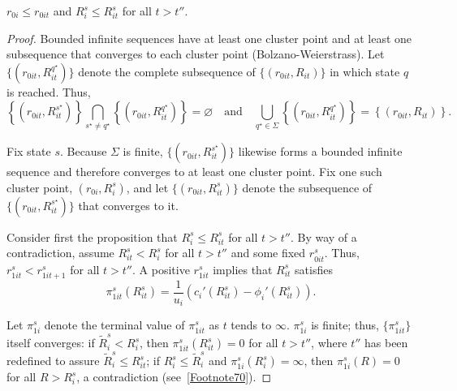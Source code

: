 \begin{lemma}\label{Lemma2}
	$r_{0i}\le r_{0it}$ and $R_i^s\le R_{it}^s$ for all $t>t''$.
\end{lemma}
\begin{proof}
Bounded infinite sequences have at least one cluster point and at least one subsequence that converges to each cluster point (Bolzano-Weierstrass). Let $\{(r_{0it},R_{it}^{q^\star})\}$ denote the complete subsequence of $\{(r_{0it},R_{it})\}$ in which state $q$ is reached. Thus,
\begin{equation*}
	\left\{\left(r_{0it},R_{it}^{s^\star}\right)\right\}\bigcap\limits_{s^\star\ne q^\star}\left\{\left(r_{0it},R_{it}^{q^\star}\right)\right\}=\varnothing\quad\text{and}\quad\bigcup\limits_{q^\star\in\Sigma}\left\{\left(r_{0it},R_{it}^{q^\star}\right)\right\}=\left\{\left(r_{0it},R_{it}\right)\right\}.
\end{equation*}

Fix state $s$. Because $\Sigma$ is finite, $\{(r_{0it},R_{it}^{s^\star})\}$ likewise forms a bounded infinite sequence and therefore converges to at least one cluster point. Fix one such cluster point, $(r_{0i}, R_i^s)$, and let $\{(r_{0it},R_{it}^s)\}$ denote the subsequence of $\{(r_{0it},R_{it}^{s^\star})\}$ that converges to it.

Consider first the proposition that $R_i^s\le R_{it}^s$ for all $t>t''$. By way of a contradiction, assume $R_{it}^s<R_i^s$ for all $t>t''$ and some fixed $r_{0it}^s$. Thus, $r_{1it}^s<r_{1it+1}^s$ for all $t>t''$. A positive $r_{1it}^s$ implies that $R_{it}^s$ satisfies
\begin{equation}\label{equationA7}
	\pi_{1it}^s(R_{it}^s)=\frac{1}{u_i}\left(c_i'(R_{it}^s)-\phi_i'(R_{it}^s)\right).
\end{equation}

Let $\pi_{1i}^s$ denote the terminal value of $\pi_{1it}^s$ as $t$ tends to $\infty$. $\pi_{1i}^s$ is finite; thus, $\{\pi_{1it}^s\}$ itself converges: if $\widetilde R_i^s<R_i^s$, then $\pi_{1it}^s(R_{it}^s)=0$ for all $t>t''$, where $t''$ has been redefined to assure $\widetilde R_i^s\le R_{it}^s$; if $R_i^s\le\widetilde R_i^s$ and $\pi_{1i}^s(R_i^s)=\infty$, then $\pi_{1i}^s(R)=0$ for all $R>R_i^s$, a contradiction (see~\autoref{Footnote70}). %


\end{proof}
